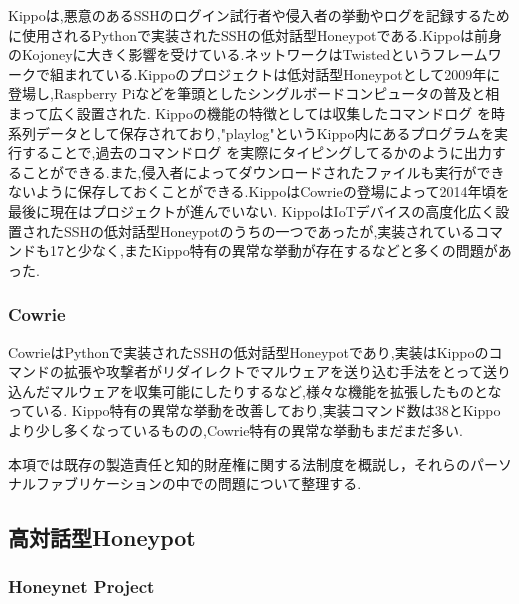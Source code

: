 Kippoは,悪意のあるSSHのログイン試行者や侵入者の挙動やログを記録するために使用されるPythonで実装されたSSHの低対話型Honeypotである.\cite{kippo}Kippoは前身のKojoney\cite{kojoney}に大きく影響を受けている.ネットワークはTwisted\cite{twisted}というフレームワークで組まれている.Kippoのプロジェクトは低対話型Honeypotとして2009年に登場し,Raspberry Pi\cite{rasp}などを筆頭としたシングルボードコンピュータ\cite{singleboard}の普及と相まって広く設置された.
Kippoの機能の特徴としては収集したコマンドログ を時系列データとして保存されており,"playlog"というKippo内にあるプログラムを実行することで,過去のコマンドログ を実際にタイピングしてるかのように出力することができる.また,侵入者によってダウンロードされたファイルも実行ができないように保存しておくことができる.KippoはCowrieの登場によって2014年頃を最後に現在はプロジェクトが進んでいない.\cite{kippowiki}
KippoはIoTデバイスの高度化広く設置されたSSHの低対話型Honeypotのうちの一つであったが,実装されているコマンドも17\cite{kippocommand}と少なく,またKippo特有の異常な挙動が存在するなどと多くの問題があった.

\subsubsection{Cowrie}
\label{tech:Cowrie}
CowrieはPythonで実装されたSSHの低対話型Honeypotであり,実装はKippoのコマンドの拡張や攻撃者がリダイレクトでマルウェアを送り込む手法をとって送り込んだマルウェアを収集可能にしたりするなど,様々な機能を拡張したものとなっている.
Kippo特有の異常な挙動を改善しており,実装コマンド数は38\cite{cowriecommand}とKippoより少し多くなっているものの\cite{differfromkippo},Cowrie特有の異常な挙動もまだまだ多い.


本項では既存の製造責任と知的財産権に関する法制度を概説し，それらのパーソナルファブリケーションの中での問題について整理する.

\subsection{高対話型Honeypot}
\label{tech:HighInteractionHoneypot}

\subsubsection{Honeynet Project}
\label{tech:Honeynet}

